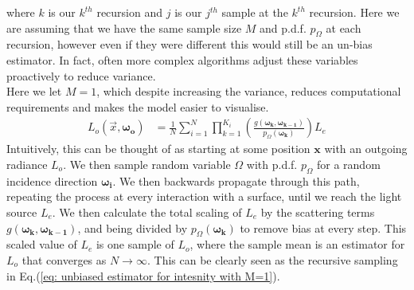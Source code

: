 \documentclass{article}
\begin{document}
where $k$ is our $k^{th}$ recursion and $j$ is our $j^{th}$ sample at the $k^{th}$ recursion.
Here we are assuming that we have the same sample size $M$ and p.d.f. $p_\Omega$ at each recursion, 
however even if they were different this would still be an un-bias estimator. 
In fact, often more complex algorithms adjust these variables proactively to reduce variance. 
\\
Here we let $M=1$, which despite increasing the variance, reduces computational requirements
and makes the model easier to visualise. 
\begin{align}
    L_o(\vec{x},\boldsymbol{\omega_o}) \label{eq: unbiased estimator for intesnity with M=1}
    &= \frac{1}{N} \sum_{i=1}^{N} \prod_{k=1}^{K_i} 
    \left( \frac{g(\boldsymbol{\omega_{k}},\boldsymbol{\omega_{k-1}})}
    {p_\Omega(\boldsymbol{\omega_{k}})} \right) L_e
\end{align}
Intuitively, this can be thought of as starting at some position $\boldsymbol{x}$
with an outgoing radiance $L_o$.
We then sample random variable $\Omega$ with p.d.f. $p_\Omega$ for a random
incidence direction $\boldsymbol{\omega_i}$.
We then backwards propagate through this path, repeating the process at every interaction with a surface,
until we reach the light source $L_e$. We then calculate the total scaling of $L_e$ by the scattering
terms $g(\boldsymbol{\omega_{k}},\boldsymbol{\omega_{k-1}})$, and being divided by $p_\Omega(\boldsymbol{\omega_k})$ to remove bias at every step. 
This scaled value of $L_e$ is one sample of $L_o$, where the sample mean is an estimator for $L_o$
that converges as $N\rightarrow\infty$.
This can be clearly seen as the recursive sampling in 
Eq.(\ref{eq: unbiased estimator for intesnity with M=1}).
\end{document}
